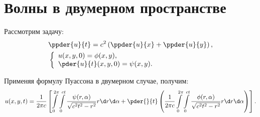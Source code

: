 \section{Волны в двумерном пространстве}

Рассмотрим задачу:
\begin{align*}
    & \ppder{u}{t} = c^2\left(\ppder{u}{x} + \ppder{u}{y}\right), \\
    & \left\{ \begin{array}{l}
        u(x, y, 0) = \phi(x, y), \\
        \ds \pder{u}{t}(x, y, 0) = \psi(x, y).
    \end{array} \right.
\end{align*}

Применяя формулу Пуассона в двумерном случае, получим:
\[
    u(x, y, t) = \frac{1}{2\pi c}\left[ \int\limits_0^{2\pi}\int\limits_0^{ct}
    \frac{\psi(r, \alpha)}{\sqrt{c^2t^2 - r^2}}r\d r\d\alpha + \pder{}{t}\left(
    \frac{1}{2\pi c}\int\limits_0^{2\pi}\int\limits_0^{ct}\frac{\phi(r, \alpha)}
    {\sqrt{c^2t^2 - r^2}}r\d r\d\alpha\right)\right].
\]
\newpage
